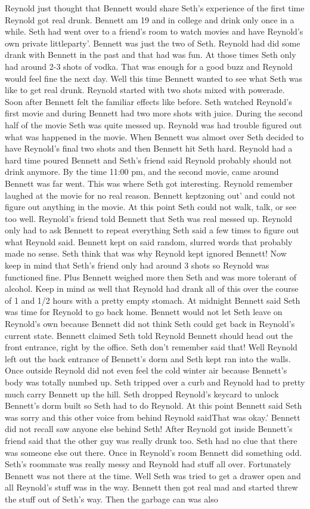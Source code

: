 \documentclass[12pt]{book}
\begin{document}
Reynold just thought that Bennett would share Seth's experience of the first time Reynold got real drunk. Bennett am 19 and in college and drink only once in a while. Seth had went over to a friend's room to watch movies and have Reynold's own private littleparty'. Bennett was just the two of Seth. Reynold had did some drank with Bennett in the past and that had was fun. At those times Seth only had around 2-3 shots of vodka. That was enough for a good buzz and Reynold would feel fine the next day. Well this time Bennett wanted to see what Seth was like to get real drunk. Reynold started with two shots mixed with powerade. Soon after Bennett felt the familiar effects like before. Seth watched Reynold's first movie and during Bennett had two more shots with juice. During the second half of the movie Seth was quite messed up. Reynold was had trouble figured out what was happened in the movie. When Bennett was almost over Seth decided to have Reynold's final two shots and then Bennett hit Seth hard. Reynold had a hard time poured Bennett and Seth's friend said Reynold probably should not drink anymore. By the time 11:00 pm, and the second movie, came around Bennett was far went. This was where Seth got interesting. Reynold remember laughed at the movie for no real reason. Bennett keptzoning out' and could not figure out anything in the movie. At this point Seth could not walk, talk, or see too well. Reynold's friend told Bennett that Seth was real messed up. Reynold only had to ask Bennett to repeat everything Seth said a few times to figure out what Reynold said. Bennett kept on said random, slurred words that probably made no sense. Seth think that was why Reynold kept ignored Bennett! Now keep in mind that Seth's friend only had around 3 shots so Reynold was functioned fine. Plus Bennett weighed more then Seth and was more tolerant of alcohol. Keep in mind as well that Reynold had drank all of this over the course of 1 and 1/2 hours with a pretty empty stomach. At midnight Bennett said Seth was time for Reynold to go back home. Bennett would not let Seth leave on Reynold's own because Bennett did not think Seth could get back in Reynold's current state. Bennett claimed Seth told Reynold Bennett should head out the front entrance, right by the office. Seth don't remember said that! Well Reynold left out the back entrance of Bennett's dorm and Seth kept ran into the walls. Once outside Reynold did not even feel the cold winter air because Bennett's body was totally numbed up. Seth tripped over a curb and Reynold had to pretty much carry Bennett up the hill. Seth dropped Reynold's keycard to unlock Bennett's dorm built so Seth had to do Reynold. At this point Bennett said Seth was sorry and this other voice from behind Reynold saidThat was okay.' Bennett did not recall saw anyone else behind Seth! After Reynold got inside Bennett's friend said that the other guy was really drunk too. Seth had no clue that there was someone else out there. Once in Reynold's room Bennett did something odd. Seth's roommate was really messy and Reynold had stuff all over. Fortunately Bennett was not there at the time. Well Seth was tried to get a drawer open and all Reynold's stuff was in the way. Bennett then got real mad and started threw the stuff out of Seth's way. Then the garbage can was also 
\end{document}
